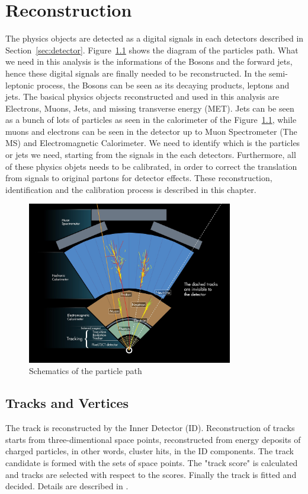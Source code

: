 \chapter{Reconstruction}

The physics objects are detected as a digital signals in each detectors described in Section~\ref{sec:detector}.
Figure~\ref{fig:ParticlePath} shows the diagram of the particles path. What we need in this analysis is the informations of the Bosons and the forward jets, hence these digital signals are finally needed to be reconstructed. In the semi-leptonic process, the Bosons can be seen as its decaying products, leptons and jets. The basical physics objects reconstructed and used in this analysis are Electrons, Muons, Jets, and missing transverse energy (MET). Jets can be seen as a bunch of lots of particles as seen in the calorimeter of the Figure~\ref{fig:ParticlePath}, while muons and electrons can be seen in the detector up to Muon Spectrometer (The MS) and Electromagnetic Calorimeter. 
We need to identify which is the particles or jets we need, starting from the signals in the each detectors. 
Furthermore, all of these physics objets needs to be calibrated, in order to correct the translation from signals to original partons for detector effects.
These reconstruction, identification and the calibration process is described in this chapter.
\begin{figure}[tbp]
\begin{center}
 \includegraphics[width=0.80\textwidth,keepaspectratio]{figures/Reconstruction/ParticlePath}
\caption{
Schematics of the particle path
}
\label{fig:ParticlePath}
\end{center}
\end{figure}
\section{Tracks and Vertices}
The track is reconstructed by the Inner Detector (ID). Reconstruction of tracks starts from three-dimentional space points, reconstructed from energy deposits of charged particles, in other words, cluster hits, in the ID components. The track candidate is formed with the sets of space points. The "track score" is calculated and tracks are selected with respect to the scores. Finally the track is fitted and decided. 
Details are described in \cite{PERF-2015-08}.
